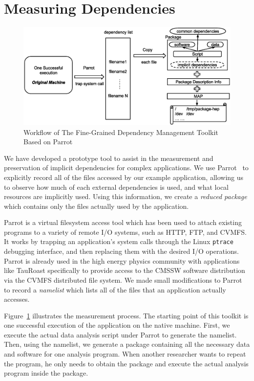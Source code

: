 \section{Measuring Dependencies}

\begin{figure}
\centering
\includegraphics[width=.8\textwidth]{workflow-parrot.eps}
\caption{Workflow of The Fine-Grained Dependency Management Toolkit Based on Parrot}
\label{fig:workflow-parrot}
\end{figure}

We have developed a prototype tool to assist in the measurement and preservation
of implicit dependencies for complex applications.
We use Parrot~\cite{thain2005parrot} to explicitly record all
of the files accessed by our example application, allowing us to observe how
much of each external dependencies is used, and what local resources are implicitly used.
Using this information, we create a \emph{reduced package} which contains
only the files actually used by the application.

Parrot is a virtual filesystem access tool which has been used to attach
existing programs to a variety of remote I/O systems, such as HTTP, FTP, and CVMFS.
It works by trapping an application's system calls through the Linux {\tt ptrace} debugging
interface, and then replacing them with the desired I/O operations.  Parrot is already used
in the high energy physics community with applications like TauRoast specifically to 
provide access to the CMSSW software distribution via the CVMFS distributed file system.
We made small modifications to Parrot to record a \emph{namelist} which lists all 
of the files that an application actually accesses.

Figure~\ref{fig:workflow-parrot} illustrates the measurement process.
The starting point of this toolkit is one successful execution of the application on the native machine.
First, we execute the actual data analysis script under Parrot to generate the namelist.
Then, using the namelist, we generate a package containing all the necessary data
and software for one analysis program. When another
researcher wants to repeat the program, he only needs to obtain the package and
execute the actual analysis program inside the package. 

